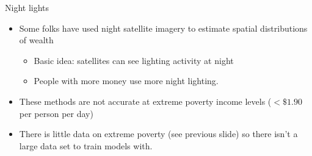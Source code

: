 \documentclass[mathserif]{beamer}
\begin{document}
\begin{frame}{Night lights}

\begin{itemize}
\item Some folks have used night satellite imagery to estimate spatial distributions of wealth
\begin{itemize}
\item Basic idea: satellites can see lighting activity at night
\item People with more money use more night lighting.  
\end{itemize}
\item These methods are not accurate at extreme poverty income levels ($<\$1.90$ per person per day)
\item There is little data on extreme poverty (see previous slide) so there isn't a large data set to train models with.
\end{itemize}
\end{frame}
\end{document}
